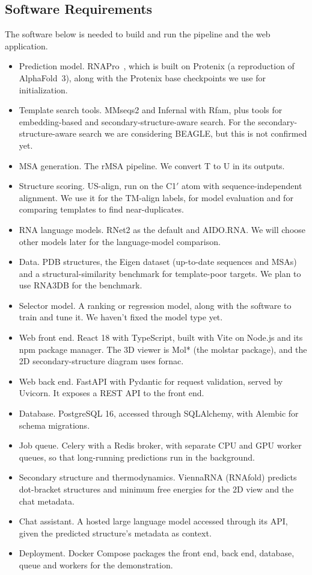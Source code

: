 \documentclass{FastFyp}
\begin{document}
\subsection{Software Requirements}
The software below is needed to build and run the pipeline and the web application.
\begin{itemize}
    \item Prediction model. RNAPro~\cite{leerna}, which is built on Protenix (a reproduction of AlphaFold~3), along with the Protenix base checkpoints we use for initialization.
    \item Template search tools. MMseqs2 and Infernal with Rfam, plus tools for embedding-based and secondary-structure-aware search. For the secondary-structure-aware search we are considering BEAGLE, but this is not confirmed yet.
    \item MSA generation. The rMSA pipeline. We convert T to U in its outputs.
    \item Structure scoring. US-align, run on the C1$'$ atom with sequence-independent alignment. We use it for the TM-align labels, for model evaluation and for comparing templates to find near-duplicates.
    \item RNA language models. RNet2 as the default and AIDO.RNA. We will choose other models later for the language-model comparison.
    \item Data. PDB structures, the Eigen dataset (up-to-date sequences and MSAs) and a structural-similarity benchmark for template-poor targets. We plan to use RNA3DB for the benchmark.
    \item Selector model. A ranking or regression model, along with the software to train and tune it. We haven't fixed the model type yet.
    \item Web front end. React 18 with TypeScript, built with Vite on Node.js and its npm package manager. The 3D viewer is Mol* (the molstar package), and the 2D secondary-structure diagram uses fornac.
    \item Web back end. FastAPI with Pydantic for request validation, served by Uvicorn. It exposes a REST API to the front end.
    \item Database. PostgreSQL 16, accessed through SQLAlchemy, with Alembic for schema migrations.
    \item Job queue. Celery with a Redis broker, with separate CPU and GPU worker queues, so that long-running predictions run in the background.
    \item Secondary structure and thermodynamics. ViennaRNA (RNAfold) predicts dot-bracket structures and minimum free energies for the 2D view and the chat metadata.
    \item Chat assistant. A hosted large language model accessed through its API, given the predicted structure's metadata as context.
    \item Deployment. Docker Compose packages the front end, back end, database, queue and workers for the demonstration.
\end{itemize}
\end{document}
